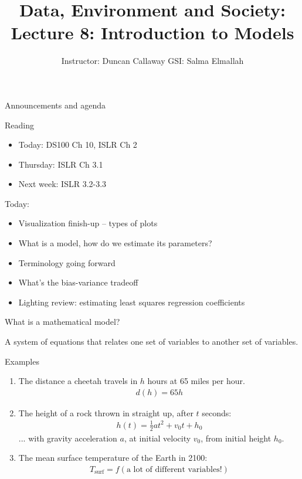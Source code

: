 \documentclass[aspectratio=169, handout]{beamer}
\title[Lecture 8] %
{Data, Environment and Society: \\{Lecture 8: Introduction to Models}}
\author[ER131: Data, Environment and Society] 
{Instructor: Duncan Callaway \newline
GSI: Salma Elmallah}
\institute[UC Berkeley] %
 {\small{ \bf September 24, 2019}}
\date[September 24, 2019]
\begin{document}
\begin{frame}
  \titlepage
\end{frame}

\begin{frame}{Announcements and agenda}

Reading
\begin{itemize}
	\item Today: DS100 Ch 10, ISLR Ch 2
	\item Thursday: ISLR Ch 3.1
	\item Next week: ISLR 3.2-3.3
\end{itemize}

\vspace{5mm}

\pause

Today:
\begin{itemize}
	\item Visualization finish-up -- types of plots
	\item What is a model, how do we estimate its parameters?
	\item Terminology going forward
	\item What's the bias-variance tradeoff
	\item Lighting review: estimating least squares regression coefficients
\end{itemize}
\end{frame}

\begin{frame}{What is a mathematical model?}

\pause
A system of equations that relates one set of variables to another set of variables.
\pause
\hspace{5mm}

Examples

\begin{enumerate}
\item The distance a cheetah travels in $h$ hours at 65 miles per hour.
\begin{align*}
d(h) = 65 h
\end{align*}
 

\item The height of a rock thrown in straight up, after $t$ seconds:
\begin{align*}
h(t) = \frac{1}{2}a t^2 + v_0t + h_0
\end{align*}
... with gravity acceleration $a$, at initial velocity $v_0$, from initial height $h_0$.

\item The mean surface temperature of the Earth in 2100:
\begin{align*}
T_{\text{surf}} = f(\text{a lot of different variables!})
\end{align*}
\end{enumerate}

\end{frame}
\end{document}
